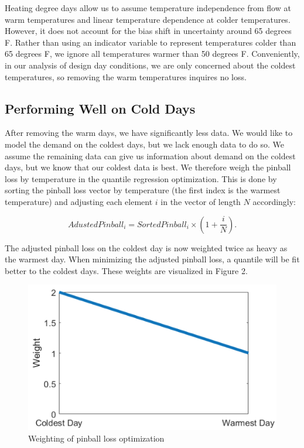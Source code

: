 \documentclass{article}
\begin{document}
Heating degree days allow us to assume temperature independence from flow at warm temperatures and linear temperature dependence at colder temperatures. However, it does not account for the bias shift in uncertainty around 65 degrees F. Rather than using an indicator variable to represent temperatures colder than 65 degrees F, we ignore all temperatures warmer than 50 degrees F. Conveniently, in our analysis of design day conditions, we are only concerned about the coldest temperatures, so removing the warm temperatures inquires no loss.

\subsection{Performing Well on Cold Days}

After removing the warm days, we have significantly less data. We would like to model the demand on the coldest days, but we lack enough data to do so. We assume the remaining data can give us information about demand on the coldest days, but we know that our coldest data is best. We therefore weigh the pinball loss by temperature in the quantile regression optimization. This is done by sorting the pinball loss vector by temperature (the first index is the warmest temperature) and adjusting each element $i$ in the vector of length $N$ accordingly:

\begin{equation}
    AdustedPinball_i = SortedPinball_i \times (1 + \frac{i}{N}).
\end{equation}

The adjusted pinball loss on the coldest day is now weighted twice as heavy as the warmest day. When minimizing the adjusted pinball loss, a quantile will be fit better to the coldest days. These weights are visualized in Figure 2.

\begin{figure} \label{fig:weighting}
	\centering
	\includegraphics[scale=0.4]{weighting.png}
	\caption{Weighting of pinball loss optimization}
\end{figure}
\end{document}
